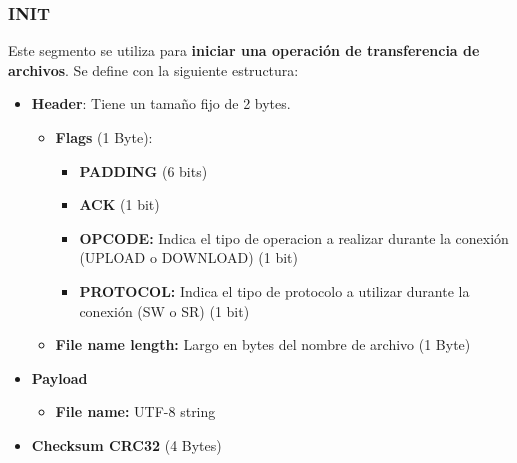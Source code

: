 \documentclass[a4paper,10pt]{article}
\begin{document}
\subsubsection{INIT}
Este segmento se utiliza para \textbf{iniciar una operación de transferencia de archivos}. 
Se define con la siguiente estructura:
\begin{itemize}
    \item \textbf{Header}: Tiene un tamaño fijo de 2 bytes.
    \begin{itemize}
        \item \textbf{Flags} (1 Byte):
        \begin{itemize}
        \item \textbf{PADDING} (6 bits)
        \item \textbf{ACK} (1 bit)
        \item \textbf{OPCODE:} Indica el tipo de operacion a realizar durante la conexión (UPLOAD o DOWNLOAD) (1 bit)
        \item \textbf{PROTOCOL:} Indica el tipo de protocolo a utilizar durante la conexión (SW o SR) (1 bit)
        \end{itemize}

        \item \textbf{File name length:} Largo en bytes del nombre de archivo (1 Byte)
    \end{itemize}
    
    \item \textbf{Payload}
    \begin{itemize}
        \item \textbf{File name:} UTF-8 string
    \end{itemize}
    
    \item \textbf{Checksum CRC32} (4 Bytes)

\end{itemize}
\end{document}
